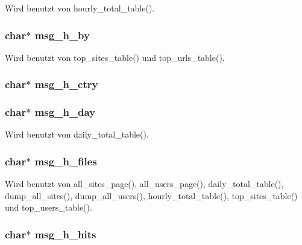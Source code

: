 Wird benutzt von hourly\_\-total\_\-table().
\subsubsection{\setlength{\rightskip}{0pt plus 5cm}char$\ast$ {\bf msg\_\-h\_\-by}}\label{lang_8h_445f2712cd567c8d33b7fb797843dea0}




Wird benutzt von top\_\-sites\_\-table() und top\_\-urls\_\-table().
\subsubsection{\setlength{\rightskip}{0pt plus 5cm}char$\ast$ {\bf msg\_\-h\_\-ctry}}\label{lang_8h_3d13e2f231a2e408c85d587974fab840}


\subsubsection{\setlength{\rightskip}{0pt plus 5cm}char$\ast$ {\bf msg\_\-h\_\-day}}\label{lang_8h_4ea7eb5797dae19227edd460213b7b0a}




Wird benutzt von daily\_\-total\_\-table().
\subsubsection{\setlength{\rightskip}{0pt plus 5cm}char$\ast$ {\bf msg\_\-h\_\-files}}\label{lang_8h_17cdd1238613c58645be27ec86da138c}




Wird benutzt von all\_\-sites\_\-page(), all\_\-users\_\-page(), daily\_\-total\_\-table(), dump\_\-all\_\-sites(), dump\_\-all\_\-users(), hourly\_\-total\_\-table(), top\_\-sites\_\-table() und top\_\-users\_\-table().
\subsubsection{\setlength{\rightskip}{0pt plus 5cm}char$\ast$ {\bf msg\_\-h\_\-hits}}\label{lang_8h_529f40f7939bbf363a37235b1b209b62}




